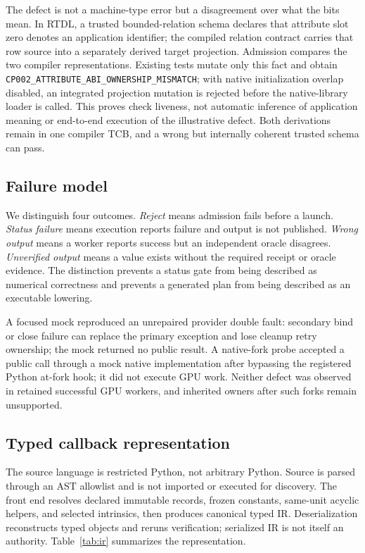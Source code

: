 \documentclass[sigplan,screen,review,anonymous]{acmart}
\newcommand{\rtdl}{\textsc{RTDL}\xspace}
\begin{document}
The defect is not a machine-type error but a disagreement over what the bits
mean. In \rtdl, a trusted bounded-relation schema declares that attribute slot
zero denotes an application identifier; the compiled relation contract carries
that row source into a separately derived target projection. Admission compares
the two compiler representations. Existing tests mutate only this fact and
obtain \texttt{CP002\_ATTRIBUTE\_ABI\_OWNERSHIP\_MISMATCH}; with native
initialization overlap disabled, an integrated projection mutation is rejected
before the native-library loader is called. This proves check liveness,
not automatic inference of application meaning or end-to-end execution of the
illustrative defect. Both derivations remain in one compiler TCB, and a wrong
but internally coherent trusted schema can pass.

\subsection{Failure model}

We distinguish four outcomes. \emph{Reject} means admission fails before a
launch. \emph{Status failure} means execution reports failure and output is not
published. \emph{Wrong output} means a worker reports success but an independent
oracle disagrees. \emph{Unverified output} means a value exists without the
required receipt or oracle evidence. The distinction prevents a status gate
from being described as numerical correctness and prevents a generated plan
from being described as an executable lowering.

A focused mock reproduced an unrepaired provider double fault: secondary bind or
close failure can replace the primary exception and lose cleanup retry ownership;
the mock returned no public result. A native-fork probe accepted a public call
through a mock native implementation after bypassing the registered Python
at-fork hook; it did not execute GPU work. Neither defect was observed in
retained successful GPU workers, and inherited owners after such forks remain
unsupported.

\subsection{Typed callback representation}

The source language is restricted Python, not arbitrary Python. Source is
parsed through an AST allowlist and is not imported or executed for discovery.
The front end resolves declared immutable records, frozen constants,
same-unit acyclic helpers, and selected intrinsics, then produces canonical
typed IR. Deserialization reconstructs typed objects and reruns verification;
serialized IR is not itself an authority. Table~\ref{tab:ir} summarizes the
representation.
\end{document}
